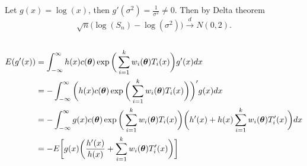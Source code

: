 Let $g(x)=\log(x)$,
then $g'(\sigma^2)=\frac{1}{\sigma^2}\ne 0$.
Then by Delta theorem
\begin{equation}
    \sqrt{n}\big(\log(S_n)-\log(\sigma^2)\big) \xrightarrow{d} N(0,2).
\end{equation}

\subsection{} %

\begin{align}
    E(g'(x))
        &=\int_{-\infty}^{\infty} h(x)c(\boldsymbol{\theta})\exp\bigg(\sum_{i=1}^{k}w_i(\boldsymbol{\theta})T_i(x)\bigg)g'(x)dx \\
        &=-\int_{-\infty}^{\infty} \bigg(h(x)c(\boldsymbol{\theta})\exp\bigg(\sum_{i=1}^{k}w_i(\boldsymbol{\theta})T_i(x)\bigg)\bigg)'g(x)dx \\
        &=-\int_{-\infty}^{\infty} g(x)c(\boldsymbol{\theta})\exp\bigg(\sum_{i=1}^{k}w_i(\boldsymbol{\theta})T_i(x)\bigg)\bigg(h'(x)+h(x)\sum_{i=1}^k w_i(\boldsymbol{\theta})T_i'(x)\bigg)dx \\
        &=-E\bigg[g(x)\bigg(\frac{h'(x)}{h(x)}+\sum_{i=1}^k w_i(\boldsymbol{\theta})T_i'(x)\bigg)\bigg]
\end{align}

\subsection{} %
